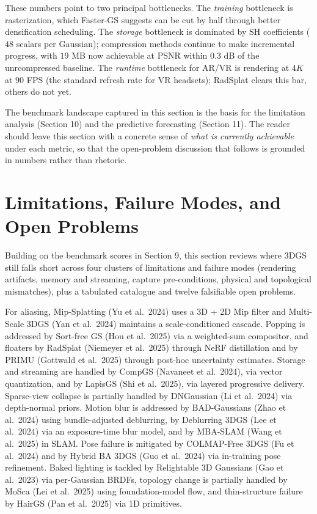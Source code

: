 These numbers point to two principal bottlenecks. The \emph{training} bottleneck is rasterization, which Faster-GS suggests can be cut by half through better densification scheduling. The \emph{storage} bottleneck is dominated by SH coefficients (\(48\) scalars per Gaussian); compression methods continue to make incremental progress, with \(19\) MB now achievable at PSNR within \(0.3\) dB of the unrcompressed baseline. The \emph{runtime} bottleneck for AR/VR is rendering at \(4K\) at \(90\) FPS (the standard refresh rate for VR headsets); RadSplat clears this bar, others do not yet.

The benchmark landscape captured in this section is the basis for the limitation analysis (Section 10) and the predictive forecasting (Section 11). The reader should leave this section with a concrete sense of \emph{what is currently achievable} under each metric, so that the open-problem discussion that follows is grounded in numbers rather than rhetoric.

\section{Limitations, Failure Modes, and Open Problems}\label{limitations-failure-modes-and-open-problems}

Building on the benchmark scores in Section 9, this section reviews where 3DGS still falls short across four clusters of limitations and failure modes (rendering artifacts, memory and streaming, capture pre-conditions, physical and topological mismatches), plus a tabulated catalogue and twelve falsifiable open problems.

For aliasing, Mip-Splatting (Yu et al.~2024) uses a 3D + 2D Mip filter and Multi-Scale 3DGS (Yan et al.~2024) maintains a scale-conditioned cascade. Popping is addressed by Sort-free GS (Hou et al.~2025) via a weighted-sum compositor, and floaters by RadSplat (Niemeyer et al.~2025) through NeRF distillation and by PRIMU (Gottwald et al.~2025) through post-hoc uncertainty estimates. Storage and streaming are handled by CompGS (Navaneet et al.~2024), via vector quantization, and by LapisGS (Shi et al.~2025), via layered progressive delivery. Sparse-view collapse is partially handled by DNGaussian (Li et al.~2024) via depth-normal priors. Motion blur is addressed by BAD-Gaussians (Zhao et al.~2024) using bundle-adjusted deblurring, by Deblurring 3DGS (Lee et al.~2024) via an exposure-time blur model, and by MBA-SLAM (Wang et al.~2025) in SLAM. Pose failure is mitigated by COLMAP-Free 3DGS (Fu et al.~2024) and by Hybrid BA 3DGS (Guo et al.~2024) via in-training pose refinement. Baked lighting is tackled by Relightable 3D Gaussians (Gao et al.~2023) via per-Gaussian BRDFs, topology change is partially handled by MoSca (Lei et al.~2025) using foundation-model flow, and thin-structure failure by HairGS (Pan et al.~2025) via 1D primitives.

